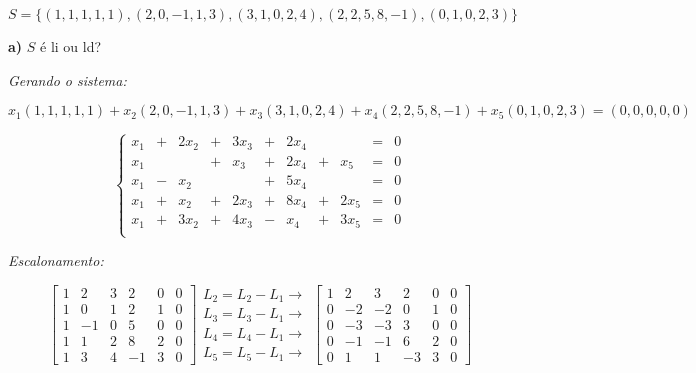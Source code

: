 \documentclass[11pt]{article}
\newenvironment{question}[1]
  {\par\addvspace{\medskipamount}
   \noindent\makebox[0pt][r]{\textbf{#1)} }\ignorespaces}
  {\par\addvspace{\medskipamount}}
\begin{document}
\begin{question}{2}
$S = \{(1, 1, 1, 1, 1),(2, 0, -1, 1, 3),(3, 1, 0, 2, 4),(2, 2, 5, 8, -1),(0, 1, 0, 2, 3)\}$

\bigskip
\textbf{a)} $S$ é li ou ld?

\bigskip
\textit{Gerando o sistema:} 

$$x_1(1,1,1,1,1)+x_2(2,0,-1,1,3)+x_3(3,1,0,2,4)+x_4(2,2,5,8,-1)+x_5(0,1,0,2,3)=(0,0,0,0,0)$$

$$
\left\{\begin{array}{rcrcrcrcrcl}
    x_1 &+ &2x_2 &+ &3x_3 &+ &2x_4 &  &     &= &0\\
    x_1 &  &     &+ &x_3  &+ &2x_4 &+ &x_5  &= &0\\
    x_1 &- &x_2  &  &     &+ &5x_4 &  &     &= &0\\
    x_1 &+ &x_2  &+ &2x_3 &+ &8x_4 &+ &2x_5 &= &0\\
    x_1 &+ &3x_2 &+ &4x_3 &- &x_4  &+ &3x_5 &= &0\\
\end{array}\right.
$$

\textit{Escalonamento:}

$$
\left[\begin{array}{rrrrr|c}
  1 & 2  & 3 & 2  & 0 & 0\\
  1 & 0  & 1 & 2  & 1 & 0\\
  1 & -1 & 0 & 5  & 0 & 0\\
  1 & 1  & 2 & 8  & 2 & 0\\
  1 & 3  & 4 & -1 & 3 & 0
\end{array}\right]
\substack{
  \mbox{$L_2=L_2-L_1 \rightarrow$}\\[.5em]
  \mbox{$L_3=L_3-L_1 \rightarrow$}\\[.5em]
  \mbox{$L_4=L_4-L_1 \rightarrow$}\\[.5em]
  \mbox{$L_5=L_5-L_1 \rightarrow$}
}
\left[\begin{array}{rrrrr|c}
  1 & 2  & 3  & 2  & 0 & 0\\
  0 & -2 & -2 & 0  & 1 & 0\\
  0 & -3 & -3 & 3  & 0 & 0\\
  0 & -1 & -1 & 6  & 2 & 0\\
  0 & 1  & 1  & -3 & 3 & 0
\end{array}\right]
$$


\end{question}
\end{document}
